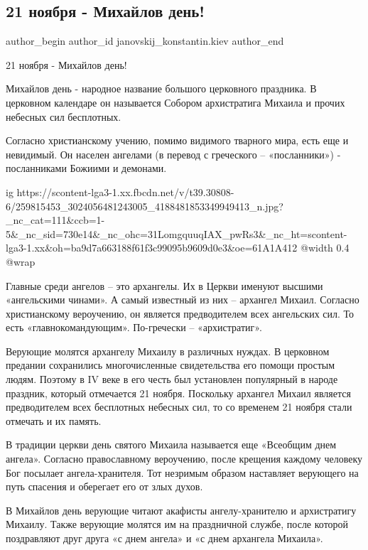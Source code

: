  
 
 
 
 
 
\subsection{21 ноября - Михайлов день!}
\label{sec:21_11_2021.fb.janovskij_konstantin.kiev.1.mihajlov_denj}
 
\ifcmt
 author_begin
   author_id janovskij_konstantin.kiev
 author_end
\fi

21 ноября - Михайлов день!

Михайлов день - народное название большого церковного праздника. В церковном
календаре он называется Собором архистратига Михаила и прочих небесных сил
бесплотных.

Согласно христианскому учению, помимо видимого тварного мира, есть еще и
невидимый. Он населен ангелами (в перевод с греческого – «посланники») -
посланниками Божиими и демонами.

\ifcmt
  ig https://scontent-lga3-1.xx.fbcdn.net/v/t39.30808-6/259815453_3024056481243005_4188481853349949413_n.jpg?_nc_cat=111&ccb=1-5&_nc_sid=730e14&_nc_ohc=31LomgquuqIAX_pwRs3&_nc_ht=scontent-lga3-1.xx&oh=ba9d7a663188f61f3c99095b9609d0e3&oe=61A1A412
  @width 0.4
  @wrap 
\fi

Главные среди ангелов – это архангелы. Их в Церкви именуют высшими «ангельскими
чинами». А самый известный из них – архангел Михаил. Согласно христианскому
вероучению, он является предводителем всех ангельских сил. То есть
«главнокомандующим». По-гречески – «архистратиг».

Верующие молятся архангелу Михаилу в различных нуждах. В церковном предании
сохранились многочисленные свидетельства его помощи простым людям. Поэтому в IV
веке в его честь был установлен популярный в народе праздник, который
отмечается 21 ноября. Поскольку архангел Михаил является предводителем всех
бесплотных небесных сил, то со временем 21 ноября стали отмечать и их память.

В традиции церкви день святого Михаила называется еще «Всеобщим днем ангела».
Согласно православному вероучению, после крещения каждому человеку Бог посылает
ангела-хранителя. Тот незримым образом наставляет верующего на путь спасения и
оберегает его от злых духов.

В Михайлов день верующие читают акафисты ангелу-хранителю и архистратигу
Михаилу. Также верующие молятся им на праздничной службе, после которой
поздравляют друг друга «с днем ангела» и «с днем архангела Михаила».


